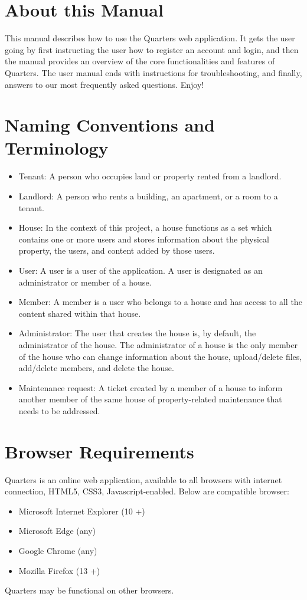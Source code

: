 \documentclass[12pt]{article}
\begin{document}
    \section{About this Manual}
    This manual describes how to use the Quarters web application. It gets the user going by first instructing the user how to register an account and login, and then the manual provides an overview of the core functionalities and features of Quarters. The user manual ends with instructions for troubleshooting, and finally, answers to our most frequently asked questions. Enjoy!

    \section{Naming Conventions and Terminology}
    \label{sec:conventions}
    \begin{itemize}
    \item Tenant: A person who occupies land or property rented from a landlord.
    \item Landlord: A person who rents a building, an apartment, or a room to a tenant.
    \item House: In the context of this project, a house functions as a set
      which contains one or more users and stores information about the
      physical property, the users, and content added by those users.
    \item User: A user is a user of the application. A user is designated as an administrator or member of a house.
    \item Member: A member is a user who belongs to a house and has access to all the content shared within that house.
    \item Administrator: The user that creates the house is, by default, the administrator of the house. The administrator of a house is the only member of the house who can change information about the house, upload/delete files, add/delete members, and delete the house.
    \item Maintenance request: A ticket created by a member of a house to inform another member of the same house of property-related maintenance that needs to be addressed.
    \end{itemize}

    \section{Browser Requirements}
    \label{sec:browserRequirement}
    Quarters is an online web application, available to all browsers with internet connection, HTML5, CSS3, Javascript-enabled. Below are compatible browser:
    \begin{itemize}
        \item Microsoft Internet Explorer (10 +)
        \item Microsoft Edge (any)
        \item Google Chrome (any)
        \item Mozilla Firefox (13 +)
    \end{itemize}
    Quarters may be functional on other browsers.
\end{document}
